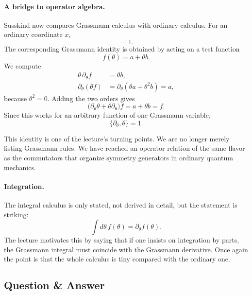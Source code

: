 \paragraph{A bridge to operator algebra.}
Susskind now compares Grassmann calculus with ordinary calculus. For an ordinary coordinate \(x\),
\begin{equation}
[\partial_x,x]=1.
\end{equation}
The corresponding Grassmann identity is obtained by acting on a test function
\begin{equation}
f(\theta)=a+\theta b.
\end{equation}
We compute
\begin{align}
\theta\,\partial_\theta f &= \theta b, \\
\partial_\theta(\theta f) &= \partial_\theta(\theta a+\theta^2 b)=a,
\end{align}
because \(\theta^2=0\). Adding the two orders gives
\begin{equation}
\bigl(\partial_\theta\theta+\theta\partial_\theta\bigr)f
=
a+\theta b
=
f.
\end{equation}
Since this works for an arbitrary function of one Grassmann variable,
\begin{equation}
\{\partial_\theta,\theta\}=1.
\end{equation}

This identity is one of the lecture's turning points. We are no longer merely listing Grassmann rules. We have reached an operator relation of the same flavor as the commutators that organize symmetry generators in ordinary quantum mechanics.

\paragraph{Integration.}
The integral calculus is only stated, not derived in detail, but the statement is striking:
\begin{equation}
\int d\theta\,f(\theta)=\partial_\theta f(\theta).
\end{equation}
The lecture motivates this by saying that if one insists on integration by parts, the Grassmann integral must coincide with the Grassmann derivative. Once again the point is that the whole calculus is tiny compared with the ordinary one.

\subsection{Question \& Answer}

